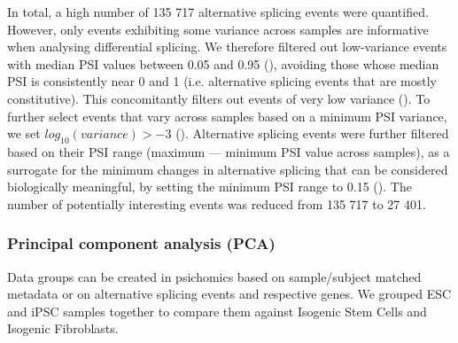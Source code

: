 In total, a high number of 135 717 alternative splicing events were quantified. However, only events exhibiting some variance across samples are informative when analysing differential splicing. We therefore filtered out low-variance events with median PSI values between 0.05 and 0.95 (), avoiding those whose median PSI is consistently near 0 and 1 (i.e. alternative splicing events that are mostly constitutive). This concomitantly filters out events of very low variance (). To further select events that vary across samples based on a minimum PSI variance, we set $log_{10}(variance) > -3$ (). Alternative splicing events were further filtered based on their PSI range (maximum — minimum PSI value across samples), as a surrogate for the minimum changes in alternative splicing that can be considered biologically meaningful, by setting the minimum PSI range to 0.15 (). The number of potentially interesting events was reduced from 135 717 to 27 401.


\subsubsection{Principal component analysis (PCA)}

Data groups can be created in psichomics based on sample/subject matched metadata or on alternative splicing events and respective genes. We grouped ESC and iPSC samples together to compare them against Isogenic Stem Cells and Isogenic Fibroblasts.

